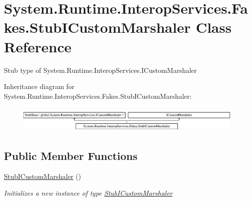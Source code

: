 \hypertarget{class_system_1_1_runtime_1_1_interop_services_1_1_fakes_1_1_stub_i_custom_marshaler}{\section{System.\-Runtime.\-Interop\-Services.\-Fakes.\-Stub\-I\-Custom\-Marshaler Class Reference}
\label{class_system_1_1_runtime_1_1_interop_services_1_1_fakes_1_1_stub_i_custom_marshaler}
}


Stub type of System.\-Runtime.\-Interop\-Services.\-I\-Custom\-Marshaler 


Inheritance diagram for System.\-Runtime.\-Interop\-Services.\-Fakes.\-Stub\-I\-Custom\-Marshaler\-:\begin{figure}[H]
\begin{center}
\leavevmode
\includegraphics[height=1.327014cm]{class_system_1_1_runtime_1_1_interop_services_1_1_fakes_1_1_stub_i_custom_marshaler}
\end{center}
\end{figure}
\subsection*{Public Member Functions}
\begin{DoxyCompactItemize}
\item 
\hyperlink{class_system_1_1_runtime_1_1_interop_services_1_1_fakes_1_1_stub_i_custom_marshaler_a4cfce5f9a9200a89a9c07656f8a47d01}{Stub\-I\-Custom\-Marshaler} ()
\begin{DoxyCompactList}\small\item\em Initializes a new instance of type \hyperlink{class_system_1_1_runtime_1_1_interop_services_1_1_fakes_1_1_stub_i_custom_marshaler}{Stub\-I\-Custom\-Marshaler}\end{DoxyCompactList}\end{DoxyCompactItemize}
